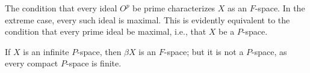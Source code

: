 The condition that every ideal $O^p$ be prime characterizes $X$ as an $F$-space. In the extreme case, every such ideal is maximal. This is evidently equivalent to the condition that every prime ideal be maximal, i.e., that $X$ be a $P$-space.

If $X$ is an infinite $P$-space, then $\beta X$ is an $F$-space; but it is not a $P$-space, as every compact $P$-space is finite.
